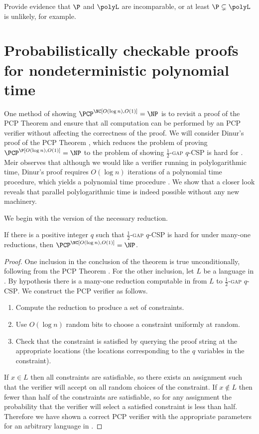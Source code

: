 \documentclass{article}
\begin{document}
\begin{todo}
  Provide evidence that $\P$ and $\polyL$ are incomparable, or at least $\P \subsetneq \polyL$ is unlikely, for example.
\end{todo}

\section{Probabilistically checkable proofs for nondeterministic polynomial time}\label{sec:dinur}

One method of showing $\PCP^\NC[O(\log n), O(1)] = \NP$ is to revisit a proof of the PCP Theorem and ensure that all computation can be performed by an \NC{} PCP verifier without affecting the correctness of the proof.
We will consider Dinur's proof of the PCP Theorem \cite{dinur07}, which reduces the problem of proving $\PCP^\P[O(\log n), O(1)] = \NP$ to the problem of showing \textsc{$\frac{1}{2}$-gap $q$-CSP} is hard for \NP.
Meir observes that although we would like a verifier running in polylogarithmic time, Dinur's proof requires $O(\log n)$ iterations of a polynomial time procedure, which yields a polynomial time procedure \cite[Section~1.2.1]{meir09}.
We show that a closer look reveals that parallel polylogarithmic time is indeed possible without any new machinery.

We begin with the \NC{} version of the necessary reduction.

\begin{lemma}\label{lem:inapprox}
  If there is a positive integer $q$ such that \textsc{$\frac{1}{2}$-gap $q$-CSP} is hard for \NP{} under \NC{} many-one reductions, then $\PCP^\NC[O(\log n), O(1)] = \NP$.
\end{lemma}
\begin{proof}
  One inclusion in the conclusion of the theorem is true unconditionally, following from the PCP Theorem \cite{almss92}.
  For the other inclusion, let $L$ be a language in \NP.
  By hypothesis there is a many-one reduction computable in \NC{} from $L$ to \textsc{$\frac{1}{2}$-gap $q$-CSP}.
  We construct the PCP verifier as follows.
  \begin{enumerate}
  \item Compute the reduction to produce a set of constraints.
  \item Use $O(\log n)$ random bits to choose a constraint uniformly at random.
  \item Check that the constraint is satisfied by querying the proof string at the appropriate locations (the locations corresponding to the $q$ variables in the constraint).
  \end{enumerate}

  If $x \in L$ then all constraints are satisfiable, so there exists an assignment such that the verifier will accept on all random choices of the constraint.
  If $x \notin L$ then fewer than half of the constraints are satisfiable, so for any assignment the probability that the verifier will select a satisfied constraint is less than half.
  Therefore we have shown a correct PCP verifier with the appropriate parameters for an arbitrary language in \NP.
\end{proof}
\end{document}
